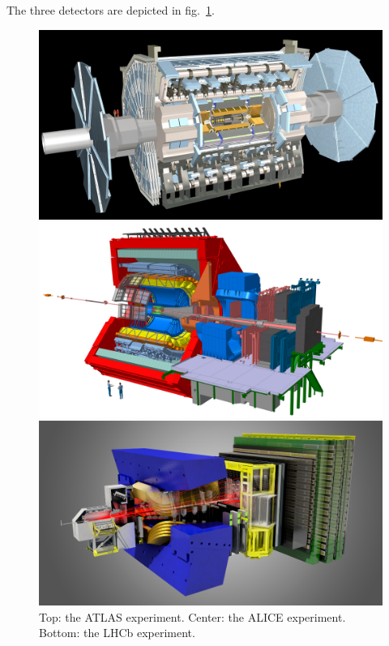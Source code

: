 \vspace*{1\baselineskip}

\noindent The three detectors are depicted in fig.~\ref{fig:ATLAS-ALICE-LHCb}.%


\begin{figure}%
\centering
\includegraphics[width=.65\textwidth]{figures/ATLAS.jpg}

\includegraphics[width=.65\textwidth]{figures/ALICE.jpg}

\includegraphics[width=.65\textwidth]{figures/LHCb.png}

\caption{Top: the ATLAS experiment. Center: the ALICE experiment. Bottom: the LHCb experiment.}
\label{fig:ATLAS-ALICE-LHCb}
\end{figure}

\clearpage

